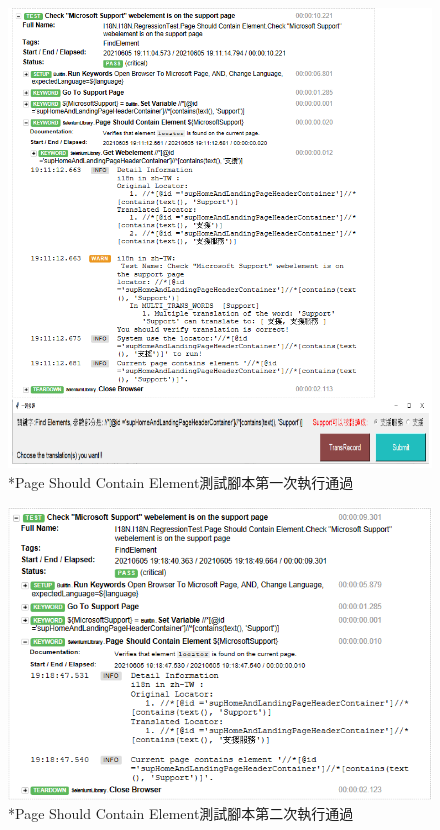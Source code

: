\begin{figure}[H]
\centering
\includegraphics[width= .7\textwidth]{../論文截圖/4.1.5-2 page should contain element 1st run.png}
\caption{*Page Should Contain Element測試腳本第一次執行通過}
\end{figure}
\begin{figure}[H]
\centering
\includegraphics[width= \textwidth]{../論文截圖/4.1.5-3 page should contain element 2nd run.png}
\caption{*Page Should Contain Element測試腳本第二次執行通過}
\end{figure}

\hspace*{\fill} \\
\\ \hspace*{\fill} \\
\\ \hspace*{\fill} \\
\\ \hspace*{\fill} \\
\\ \hspace*{\fill} \\
